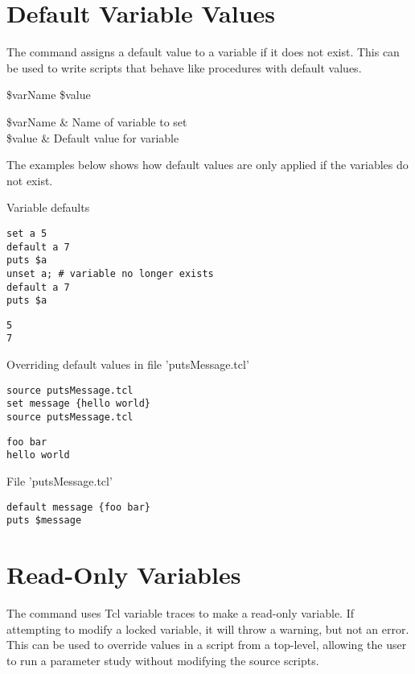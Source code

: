 \documentclass{article}
\begin{document}
\clearpage
\section{Default Variable Values}
The command  assigns a default value to a variable if it does not exist.
This can be used to write scripts that behave like procedures with default values.
\begin{syntax}
 \$varName \$value
\end{syntax}
\begin{args}
\$varName & Name of variable to set \\
\$value & Default value for variable
\end{args}

The examples below shows how default values are only applied if the variables do not exist.
\begin{example}{Variable defaults}
\begin{lstlisting}
set a 5
default a 7
puts $a
unset a; # variable no longer exists
default a 7
puts $a
\end{lstlisting}
\tcblower
\begin{lstlisting}
5
7
\end{lstlisting}
\end{example}
\begin{example}{Overriding default values in file 'putsMessage.tcl'}
\begin{lstlisting}
source putsMessage.tcl
set message {hello world}
source putsMessage.tcl
\end{lstlisting}
\tcblower
\begin{lstlisting}
foo bar
hello world
\end{lstlisting}
\end{example}
\begin{example}{File 'putsMessage.tcl'}
\begin{lstlisting}
default message {foo bar}
puts $message
\end{lstlisting}
\end{example}


\clearpage
\section{Read-Only Variables}
The command  uses Tcl variable traces to make a read-only variable. 
If attempting to modify a locked variable, it will throw a warning, but not an error.
This can be used to override values in a script from a top-level, allowing the user to run a parameter study without modifying the source scripts.
\end{document}
